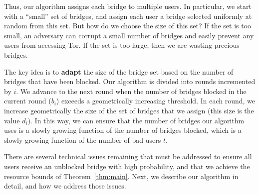 \documentclass[a4paper,UKenglish]{lipics-v2016}
\begin{document}
Thus, our algorithm assigns each bridge to multiple users.  In particular, we start with a ``small'' set of bridges, and assign each user a bridge selected uniformly at random from this set.  But how do we choose the size of this set?  If the set is too small, an adversary can corrupt a small number of bridges and easily prevent any users from accessing Tor.  If the set is too large, then we are wasting precious bridges.

The key idea is to \textbf{adapt} the size of the bridge set based on the number of bridges that have been blocked.  Our algorithm is divided into rounds incremented by $i$.  We advance to the next round when the number of bridges blocked in the current round ($b_i$) exceeds a geometrically increasing threshold.  In each round, we increase geometrically the size of the set of bridges that we assign (this size is the value $d_i$).  In this way, we can ensure that the number of bridges our algorithm uses is a slowly growing function of the number of bridges blocked, which is a slowly growing function of the number of bad users $t$.

There are several technical issues remaining that must be addressed to ensure all users receive an unblocked bridge with high probability, and that we achieve the resource bounds of Theorem~\ref{thm:main}.  Next, we describe our algorithm in detail, and how we address those issues. 




\end{document}
